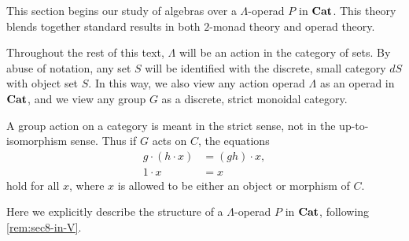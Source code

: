 This section begins our study of algebras over a $\Lambda$-operad $P$ in $\mathbf{Cat}$.
This theory blends together standard results in both $2$-monad theory and operad theory.

\begin{conv}\label{conv:set-disc}
Throughout the rest of this text, $\Lambda$ will be an action in the category of sets.
By abuse of notation, any set $S$ will be identified with the discrete, small category $dS$ with object set $S$.
In this way, we also view any action operad $\Lambda$ as an operad in $\mathbf{Cat}$, and we view any group $G$ as a discrete, strict monoidal category.
\end{conv}

\begin{conv}\label{conv:group-act-cat}
A group action on a category is meant in the strict sense, not in the up-to-isomorphism sense.
Thus if $G$ acts on $C$, the equations
\begin{align*}
g \cdot (h \cdot x) & = (gh) \cdot x,\\
1 \cdot x & = x
\end{align*}
hold for all $x$, where $x$ is allowed to be either an object or morphism of $C$.
\end{conv}


\begin{rem}\label{rem:lop-in-cat}
Here we explicitly describe the structure of a $\Lambda$-operad $P$ in $\mathbf{Cat}$, following \cref{rem:sec8-in-V}.
\end{rem}

